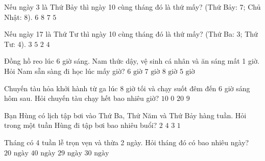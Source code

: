 \begin{ex} %
Nếu ngày 3 là Thứ Bảy thì ngày 10 cùng tháng đó là thứ mấy? (Thứ Bảy: 7; Chủ Nhật: 8).
\choice
{$6$}
{$8$}
{\True $7$}
{$5$}
\end{ex}

\begin{ex} %
Nếu ngày 17 là Thứ Tư thì ngày 10 cùng tháng đó là thứ mấy? (Thứ Ba: 3; Thứ Tư: 4).
\choice
{$3$}
{$5$}
{$2$}
{\True $4$}
\end{ex}

\begin{ex} %
Đồng hồ reo lúc 6 giờ sáng. Nam thức dậy, vệ sinh cá nhân và ăn sáng mất 1 giờ. Hỏi Nam sẵn sàng đi học lúc mấy giờ?
\choice
{$6\text{ giờ}$}
{\True $7\text{ giờ}$}
{$8\text{ giờ}$}
{$5\text{ giờ}$}
\end{ex}

\begin{ex} %
Chuyến tàu hỏa khởi hành từ ga lúc 8 giờ tối và chạy suốt đêm đến 6 giờ sáng hôm sau. Hỏi chuyến tàu chạy hết bao nhiêu giờ?
\choice
{\True $10$}
{$0$}
{$20$}
{$9$}
\end{ex}

\begin{ex} %
Bạn Hùng có lịch tập bơi vào Thứ Ba, Thứ Năm và Thứ Bảy hàng tuần. Hỏi trong một tuần Hùng đi tập bơi bao nhiêu buổi?
\choice
{$2$}
{$4$}
{\True $3$}
{$1$}
\end{ex}

\begin{ex} %
Tháng có 4 tuần lễ trọn vẹn và thừa 2 ngày. Hỏi tháng đó có bao nhiêu ngày?
\choice
{$20\text{ ngày}$}
{$40\text{ ngày}$}
{$29\text{ ngày}$}
{\True $30\text{ ngày}$}
\end{ex}

